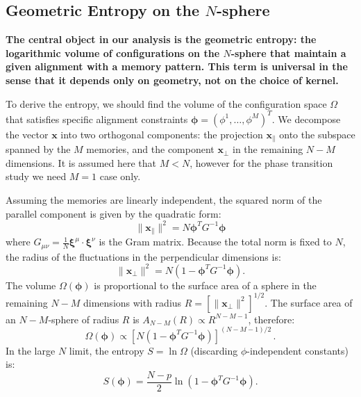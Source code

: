 \documentclass{article}
\theoremstyle{plain}
\theoremstyle{definition}
\theoremstyle{remark}
\begin{document}
\subsection{Geometric Entropy on the $N$-sphere}

\textbf{The central object in our analysis is the geometric entropy: the logarithmic volume of configurations on the $N$-sphere that maintain a given alignment with a memory pattern. This term is universal in the sense that it depends only on geometry, not on the choice of kernel.}

To derive the entropy, we should find the volume of the configuration space $\Omega$ that satisfies specific alignment constraints $\bm{\phi} = (\phi^1, \dots, \phi^M)^T$. We decompose the vector $\bm{x}$ into two orthogonal components: the projection $\bm{x}_{\parallel}$ onto the subspace spanned by the $M$ memories, and the component $\bm{x}_{\perp}$ in the remaining $N-M$ dimensions. It is assumed here that $M<N$, however for the phase transition study we need $M=1$ case only.

Assuming the memories are linearly independent, the squared norm of the parallel component is given by the quadratic form:
\begin{equation}
    \|\mathbf{x}_{\parallel}\|^2 = N \bm{\phi}^T G^{-1} \bm{\phi}
\end{equation}
where $G_{\mu\nu} = \frac{1}{N} \bm{\xi}^\mu \cdot \bm{\xi}^\nu$ is the Gram matrix. Because the total norm is fixed to $N$, the radius of the fluctuations in the perpendicular dimensions is:
\begin{equation}
    \|\mathbf{x}_{\perp}\|^2 = N \left( 1 - \bm{\phi}^T G^{-1} \bm{\phi} \right).
\end{equation}
The volume $\Omega(\bm{\phi})$ is proportional to the surface area of a sphere in the remaining $N-M$ dimensions with radius $R = [\|\mathbf{x}_{\perp}\|^2]^{1/2}$. The surface area of an $N-M$-sphere of radius $R$ is $A_{N-M}(R) \propto R^{N-M-1}$, therefore:
\begin{equation}
    \Omega(\bm{\phi}) \propto \left[ N \left( 1 - \bm{\phi}^T G^{-1} \bm{\phi} \right) \right]^{(N-M-1)/2}\,.
\end{equation}
In the large $N$ limit, the entropy $S = \ln \Omega$ (discarding $\phi$-independent constants) is:
\begin{equation}
    S(\bm{\phi}) = \frac{N-p}{2} \ln \left( 1 - \bm{\phi}^T G^{-1} \bm{\phi} \right).
\end{equation}
\end{document}
